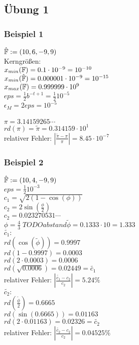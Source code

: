 \subsection{Übung 1}
\subsubsection{Beispiel 1}
$ \hat{\mathbb{F}} := (10,6,-9,9) $ \\
Kerngrößen:\\
$ x_{min}(\mathbb{F}) = 0.1 \cdot 10^{-9} = 10^{-10} $ \\
$ x_{min}(\hat{\mathbb{F}}) = 0.000001 \cdot 10^{-9} = 10^{-15} $ \\
$ x_{max}(\mathbb{F}) = 0.999999 \cdot 10^{9} $ \\
$ eps = \frac{1}{2} b^{-t + 1} = \frac{1}{2} 10^{-5} $ \\
$ \epsilon_{M} = 2eps = 10^{-5} $ \\
\\
$ \pi = 3.14159265\cdots $ \\
$ rd(\pi) = \tilde{\pi} = 0.314159 \cdot 10^1 $ \\
relativer Fehler: $ | \frac{\tilde{\pi} - \pi}{\pi} | = 8.45 \cdot 10^{-7} $

\subsubsection{Beispiel 2}
$ \hat{\mathbb{F}} := (10,4,-9,9) $ \\
$ eps = \frac{1}{2} 10^{-3} $ \\
$ c_1 = \sqrt{2(1-\cos(\phi))} $ \\
$ c_2 = 2 \sin(\frac{\phi}{2}) $ \\
$ c_2 = 0.023270531\cdots $ \\
$ \phi= \frac{4}{3} \;TODOabstand \tilde{\phi} = 0.1333 \cdot 10 = 1.333 $ \\

$ \tilde{c_1}: $ \\
$ rd({\cos}(\tilde{\phi})) = 0.9997 $ \\
$ rd(1 - 0.9997) = 0.0003 $ \\
$ rd(2 \cdot 0.0003) = 0.0006 $ \\
$ rd(\sqrt{0.0006}) = 0.02449 = \tilde{c_1} $ \\
relativer Fehler: $ | \frac{\tilde{c_1} - c_2}{c_2} | = 5.24\% $ \\

$ \tilde{c_2}: $ \\
$ rd(\frac{\tilde{\phi}}{2}) = 0.6665 $ \\
$ rd(\sin(0.6665)) = 0.01163 $ \\
$ rd(2 \cdot 0.01163) = 0.02326 = \tilde{c_2} $ \\
relativer Fehler: $ | \frac{\tilde{c_2} - c_2}{c_2} | = 0.04525\% $ \\

